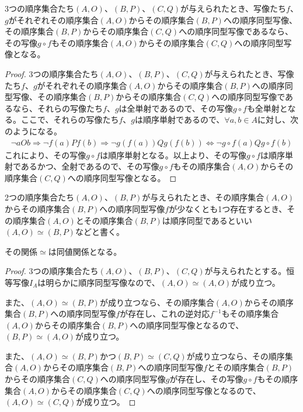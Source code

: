 \documentclass[dvipdfmx]{jsarticle}
\begin{document}
\begin{thm}\label{1.3.1.13}
3つの順序集合たち$(A,O)$、$(B,P)$、$(C,Q)$が与えられたとき、写像たち$f$、$g$がそれぞれその順序集合$(A,O)$からその順序集合$(B,P)$への順序同型写像、その順序集合$(B,P)$からその順序集合$(C,Q)$への順序同型写像であるなら、その写像$g \circ f$もその順序集合$(A,O)$からその順序集合$(C,Q)$への順序同型写像となる。
\end{thm}
\begin{proof}
3つの順序集合たち$(A,O)$、$(B,P)$、$(C,Q)$が与えられたとき、写像たち$f$、$g$がそれぞれその順序集合$(A,O)$からその順序集合$(B,P)$への順序同型写像、その順序集合$(B,P)$からその順序集合$(C,Q)$への順序同型写像であるなら、それらの写像たち$f$、$g$は全単射であるので、その写像$g \circ f$も全単射となる。ここで、それらの写像たち$f$、$g$は順序単射であるので、$\forall a,b \in A$に対し、次のようになる。
\begin{align*}
\neg aOb \Rightarrow \neg f(a)Pf(b) \Rightarrow \neg g\left( f(a) \right)Qg\left( f(b) \right) \Leftrightarrow \neg g \circ f(a)Qg \circ f(b)
\end{align*}
これにより、その写像$g \circ f$は順序単射となる。以上より、その写像$g \circ f$は順序単射であるかつ、全射であるので、その写像$g \circ f$もその順序集合$(A,O)$からその順序集合$(C,Q)$への順序同型写像となる。
\end{proof}
\begin{dfn}
2つの順序集合たち$(A,O)$、$(B,P)$が与えられたとき、その順序集合$(A,O)$からその順序集合$(B,P)$への順序同型写像$f$が少なくとも1つ存在するとき、その順序集合$(A,O)$とその順序集合$(B,P)$は順序同型であるといい$(A,O) \simeq (B,P)$などと書く。
\end{dfn}
\begin{thm}\label{1.3.1.14}
その関係$\simeq$は同値関係となる。
\end{thm}
\begin{proof}
3つの順序集合たち$(A,O)$、$(B,P)$、$(C,Q)$が与えられたとする。恒等写像$I_{A}$は明らかに順序同型写像なので、$(A,O) \simeq (A,O)$が成り立つ。\par
また、$(A,O) \simeq (B,P)$が成り立つなら、その順序集合$(A,O)$からその順序集合$(B,P)$への順序同型写像$f$が存在し、これの逆対応$f^{- 1}$もその順序集合$(A,O)$からその順序集合$(B,P)$への順序同型写像となるので、$(B,P) \simeq (A,O)$が成り立つ。\par
また、$(A,O) \simeq (B,P)$かつ$(B,P) \simeq (C,Q)$が成り立つなら、その順序集合$(A,O)$からその順序集合$(B,P)$への順序同型写像$f$とその順序集合$(B,P)$からその順序集合$(C,Q)$への順序同型写像$g$が存在し、その写像$g \circ f$もその順序集合$(A,O)$からその順序集合$(C,Q)$への順序同型写像となるので、$(A,O) \simeq (C,Q)$が成り立つ。
\end{proof}
\end{document}
